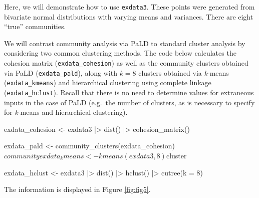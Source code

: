 Here, we will demonstrate how to use \texttt{exdata3}. These points were
generated from bivariate normal distributions with varying means and
variances. There are eight ``true'' communities.

We will contrast community analysis via PaLD to standard cluster
analysis by considering two common clustering methods. The code below
calculates the cohesion matrix (\texttt{exdata\_cohesion}) as well as
the community clusters obtained via PaLD (\texttt{exdata\_pald}), along
with \(k=8\) clusters obtained via \emph{k}-means
(\texttt{exdata\_kmeans}) and hierarchical clustering using complete
linkage (\texttt{exdata\_hclust}). Recall that there is no need to
determine values for extraneous inputs in the case of PaLD (e.g.~the
number of clusters, as is necessary to specify for \emph{k}-means and
hierarchical clustering).

\begin{Schunk}
\begin{Sinput}
exdata_cohesion <- exdata3 |>
  dist() |>
  cohesion_matrix()

exdata_pald <- community_clusters(exdata_cohesion)$community

exdata_kmeans <- kmeans(exdata3, 8)$cluster

exdata_hclust <- exdata3 |>
  dist() |>
  hclust() |>
  cutree(k = 8) 
\end{Sinput}
\end{Schunk}

The information is displayed in Figure \ref{fig:fig5}.

